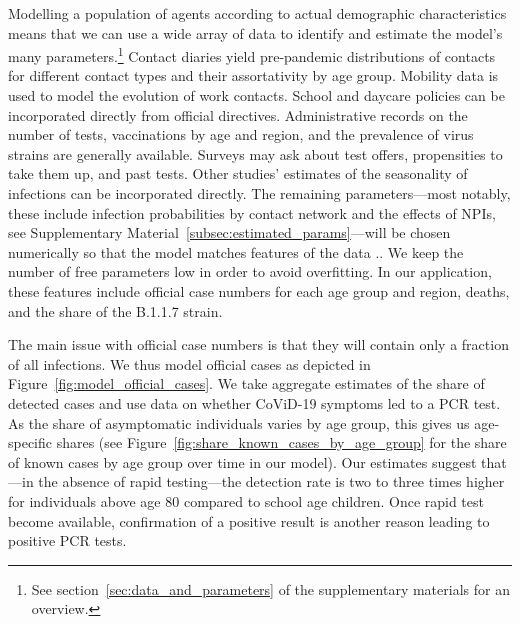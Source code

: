 Modelling a population of agents according to actual demographic characteristics means
that we can use a wide array of data to identify and estimate the model's many
parameters.\footnote{See section~\ref{sec:data_and_parameters} of the supplementary
materials for an overview.} Contact diaries yield pre-pandemic distributions of contacts
for different contact types and their assortativity by age group. Mobility data is used
to model the evolution of work contacts. School and daycare policies can be incorporated
directly from official directives. Administrative records on the number of tests,
vaccinations by age and region, and the prevalence of virus strains are generally
available. Surveys may ask about test offers, propensities to take them up, and past
tests. Other studies' estimates of the seasonality of infections can be incorporated
directly. The remaining parameters---most notably, these include infection probabilities
by contact network and the effects of NPIs, see Supplementary
Material~\ref{subsec:estimated_params}---will be chosen numerically so that the model
matches features of the data \citep[see][for the general method, also described in
Supplementary Material \ref{sec:model}]{McFadden1989}.. We keep the number of free parameters
low in order to avoid overfitting. In our application, these features include  official
case numbers for each age group and region, deaths, and the share of the B.1.1.7 strain.

The main issue with official case numbers is that they will contain only a fraction of
all infections. We thus model official cases as depicted in
Figure~\ref{fig:model_official_cases}. We take aggregate estimates of the share of
detected cases and use data on whether CoViD-19 symptoms led to a PCR test. As the share
of asymptomatic individuals varies by age group, this gives us age-specific shares (see
Figure~\ref{fig:share_known_cases_by_age_group} for the share of known cases by age
group over time in our model). Our estimates suggest that---in the absence of rapid
testing---the detection rate is two to three times higher for individuals above age 80
compared to school age children.
Once rapid test become available, confirmation of a positive result is another reason
leading to positive PCR tests.

